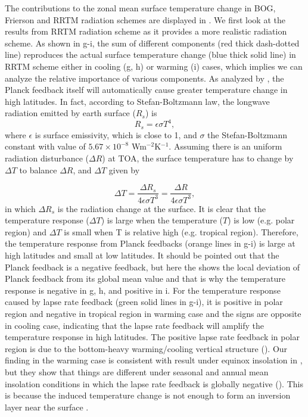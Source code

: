 The contributions to the zonal mean surface temperature change in BOG, Frierson and RRTM radiation schemes are displayed in . We first look at the results from RRTM radiation scheme as it provides a more realistic radiation scheme. As shown in g-i, the sum of different components (red thick dash-dotted line) reproduces the actual surface temperature change (blue thick solid line) in RRTM scheme either in cooling (g, h) or warming (i) cases, which implies we can analyze the relative importance of various components. As analyzed by \cite{Pithan2014}, the Planck feedback itself will automatically cause greater temperature change in high latitudes. In fact, according to Stefan-Boltzmann law, the longwave radiation emitted by earth surface ($R_s$) is
\begin{equation}
	R_s = \epsilon\sigma T^4,
\end{equation}
where $\epsilon$ is surface emissivity, which is close to 1, and $\sigma$ the Stefan-Boltzmann constant with value of $5.67\times 10^{-8}$ Wm$^{-2}$K$^{-1}$. Assuming there is an uniform radiation disturbance ($\Delta R$) at TOA, the surface temperature has to change by $\Delta T$ to balance $\Delta R$, and $\Delta T$ given by

\begin{equation}
\Delta T =\frac{\Delta R_s}{4\epsilon\sigma T^3}=\frac{\Delta R}{4\epsilon\sigma T^3},
\end{equation}
in which $\Delta R_s$ is the radiation change at the surface. It is clear that the temperature response ($\Delta T$) is large when the temperature ($T$) is low (e.g. polar region) and $\Delta T$ is small when T is relative high (e.g. tropical region). Therefore, the temperature response from Planck feedbacks (orange lines in g-i) is large at high latitudes and small at low latitudes. It should be pointed out that the Planck feedback is a negative feedback, but here the  shows the local deviation of Planck feedback from its global mean value and that is why the temperature response is negative in g, h, and positive in i. For the temperature response caused by lapse rate feedback (green solid lines in g-i), it is positive in polar region and negative in tropical region in warming case and the signs are opposite in cooling case, indicating that the lapse rate feedback will amplify the temperature response in high latitudes. The positive lapse rate feedback in polar region is due to the bottom-heavy warming/cooling vertical structure (). Our finding in the warming case is consistent with result under equinox insolation in \cite{Kim2018}, but they show that things are different under seasonal and annual mean insolation conditions in which the lapse rate feedback is globally negative (). This is because the induced temperature change is not enough to form an inversion layer near the surface \citep{Kim2018}.


